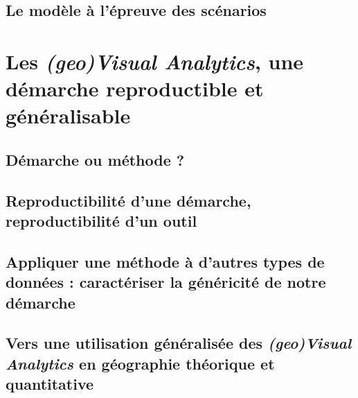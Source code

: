 \subsection{Le modèle à l'épreuve des scénarios}

\section{Les \textit{(geo)Visual Analytics}, une démarche reproductible et généralisable}
\subsection{Démarche ou méthode ?}
\subsection{Reproductibilité d'une démarche, reproductibilité d'un outil}
\subsection{Appliquer une méthode à d'autres types de données : caractériser la généricité de notre démarche}
\subsection{Vers une utilisation généralisée des \textit{(geo)Visual Analytics} en géographie théorique et quantitative}

%
%
